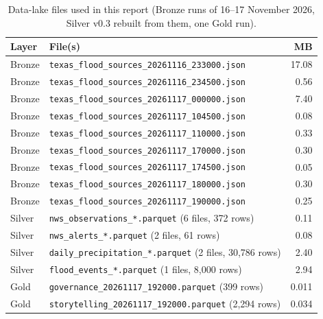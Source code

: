 \begin{table}[H]\centering\footnotesize
\caption{Data-lake files used in this report (Bronze runs of 16--17 November 2026, Silver v0.3 rebuilt from them, one Gold run).}\label{tab:inventory}
\begin{tabular}{@{}llr@{}}\toprule
Layer & File(s) & MB\\\midrule
Bronze & \texttt{texas\_flood\_sources\_20261116\_233000.json} & 17.08\\
Bronze & \texttt{texas\_flood\_sources\_20261116\_234500.json} & 0.56\\
Bronze & \texttt{texas\_flood\_sources\_20261117\_000000.json} & 7.40\\
Bronze & \texttt{texas\_flood\_sources\_20261117\_104500.json} & 0.08\\
Bronze & \texttt{texas\_flood\_sources\_20261117\_110000.json} & 0.33\\
Bronze & \texttt{texas\_flood\_sources\_20261117\_170000.json} & 0.30\\
Bronze & \texttt{texas\_flood\_sources\_20261117\_174500.json} & 0.05\\
Bronze & \texttt{texas\_flood\_sources\_20261117\_180000.json} & 0.30\\
Bronze & \texttt{texas\_flood\_sources\_20261117\_190000.json} & 0.25\\
Silver & \texttt{nws\_observations\_*.parquet} (6 files, 372 rows) & 0.11\\
Silver & \texttt{nws\_alerts\_*.parquet} (2 files, 61 rows) & 0.08\\
Silver & \texttt{daily\_precipitation\_*.parquet} (2 files, 30,786 rows) & 2.40\\
Silver & \texttt{flood\_events\_*.parquet} (1 files, 8,000 rows) & 2.94\\
Gold & \texttt{governance\_20261117\_192000.parquet} (399 rows) & 0.011\\
Gold & \texttt{storytelling\_20261117\_192000.parquet} (2,294 rows) & 0.034\\
\bottomrule\end{tabular}\end{table}
